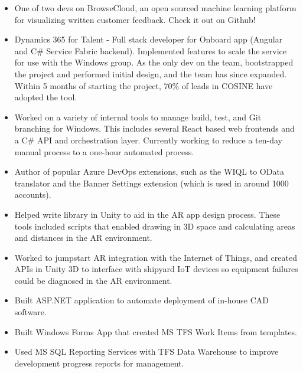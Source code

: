 \documentclass[10pt,a4paper]{altacv}
\begin{document}
\begin{itemize}
\item One of two devs on BrowseCloud, an open sourced machine learning platform for visualizing written customer feedback. Check it out on Github!
\item Dynamics 365 for Talent - Full stack developer for Onboard app (Angular and C\# Service Fabric backend). Implemented features to scale the service for use with the Windows group. As the only dev on the team, bootstrapped the project and performed initial design, and the team has since expanded. Within 5 months of starting the project, 70\% of leads in COSINE have adopted the tool.
\item Worked on a variety of internal tools to manage build, test, and Git branching for Windows. This includes several React based web frontends and a C\# API and orchestration layer. Currently working to reduce a ten-day manual process to a one-hour automated process.
\item Author of popular Azure DevOps extensions, such as the WIQL to OData translator and the Banner Settings extension (which is used in around 1000 accounts).
\end{itemize}

\divider

\begin{itemize}
\item Helped write library in Unity to aid in the AR app design process. These tools included scripts that enabled drawing in 3D space and calculating areas and distances in the AR environment. 
\item Worked to jumpstart AR integration with the Internet of Things, and created APIs in Unity 3D to interface with shipyard IoT devices so equipment failures could be diagnosed in the AR environment.
\end{itemize}

\divider


\begin{itemize}
\item Built ASP.NET application to automate deployment of in-house CAD software.
\item Built Windows Forms App that created MS TFS Work Items from templates.
\item Used MS SQL Reporting Services with TFS Data Warehouse to improve development progress reports for management.
\end{itemize}
\end{document}
